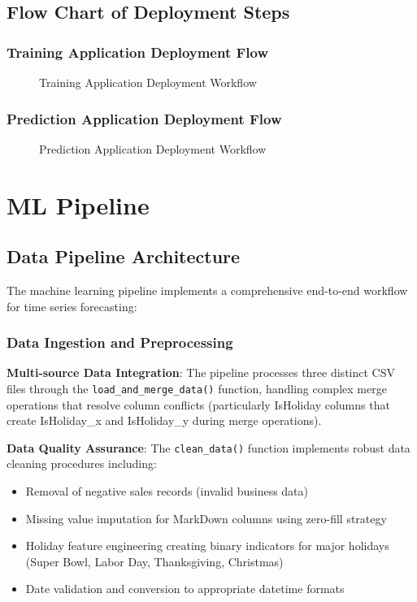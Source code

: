 \subsection{Flow Chart of Deployment Steps}

\subsubsection{Training Application Deployment Flow}

\begin{figure}[H]
	\centering
	
	\caption{Training Application Deployment Workflow}
	\label{fig:training_deployment_flow}
\end{figure}

\subsubsection{Prediction Application Deployment Flow}

\begin{figure}[H]
	\centering
	
	\caption{Prediction Application Deployment Workflow}
	\label{fig:prediction_deployment_flow}
\end{figure}

\section{ML Pipeline}

\subsection{Data Pipeline Architecture}

The machine learning pipeline implements a comprehensive end-to-end workflow for time series forecasting:

\subsubsection{Data Ingestion and Preprocessing}

\textbf{Multi-source Data Integration}: The pipeline processes three distinct CSV files through the \texttt{load\_and\_merge\_data()} function, handling complex merge operations that resolve column conflicts (particularly IsHoliday columns that create IsHoliday\_x and IsHoliday\_y during merge operations).

\textbf{Data Quality Assurance}: The \texttt{clean\_data()} function implements robust data cleaning procedures including:
\begin{itemize}
	\item Removal of negative sales records (invalid business data)
	\item Missing value imputation for MarkDown columns using zero-fill strategy
	\item Holiday feature engineering creating binary indicators for major holidays (Super Bowl, Labor Day, Thanksgiving, Christmas)
	\item Date validation and conversion to appropriate datetime formats
\end{itemize}

